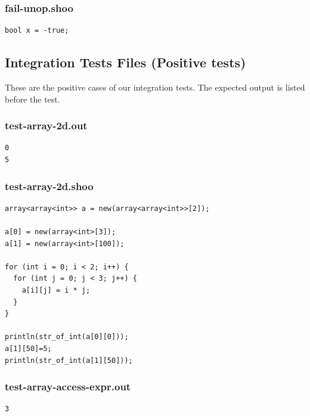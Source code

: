 \documentclass[12pt]{article}
\begin{document}
\subsubsection{fail-unop.shoo}
\begin{mdframed}[hidealllines=true,backgroundcolor=blue!10]
\begin{lstlisting}
bool x = -true;
\end{lstlisting}
\end{mdframed}

\subsection{Integration Tests Files (Positive tests)}
These are the positive cases of our integration tests. The expected output is listed before the test. \\
\subsubsection{test-array-2d.out}
\begin{mdframed}[hidealllines=true,backgroundcolor=green!10]
\begin{lstlisting}
0
5
\end{lstlisting}
\end{mdframed}
\subsubsection{test-array-2d.shoo}
\begin{mdframed}[hidealllines=true,backgroundcolor=blue!10]
\begin{lstlisting}
array<array<int>> a = new(array<array<int>>[2]);

a[0] = new(array<int>[3]);
a[1] = new(array<int>[100]);

for (int i = 0; i < 2; i++) {
  for (int j = 0; j < 3; j++) {
    a[i][j] = i * j;
  }
}

println(str_of_int(a[0][0]));
a[1][50]=5;
println(str_of_int(a[1][50]));
\end{lstlisting}
\end{mdframed}
\subsubsection{test-array-access-expr.out}
\begin{mdframed}[hidealllines=true,backgroundcolor=green!10]
\begin{lstlisting}
3
\end{lstlisting}
\end{mdframed}
\end{document}
